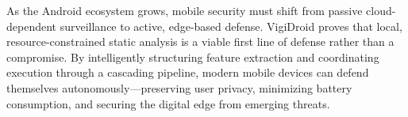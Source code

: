 As the Android ecosystem grows, mobile security must shift from passive cloud-dependent surveillance to active, edge-based defense. VigiDroid proves that local, resource-constrained static analysis is a viable first line of defense rather than a compromise. By intelligently structuring feature extraction and coordinating execution through a cascading pipeline, modern mobile devices can defend themselves autonomously—preserving user privacy, minimizing battery consumption, and securing the digital edge from emerging threats.

\endinput

